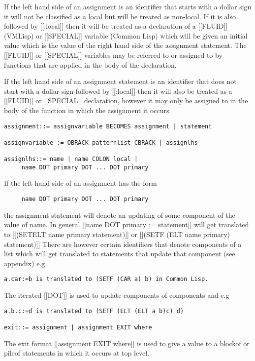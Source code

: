 \documentclass{article}
\begin{document}
If the left hand side of an assignment is an identifier that starts with
a dollar sign it will not be classified as a local but will
be treated as non-local. If it is also followed by [[:local]] then it
will be treated as a declaration of a [[FLUID]] (VMLisp) or [[SPECIAL]]
variable (Common Lisp) which will be given an initial value which is the
value of the right hand side of the assignment statement.
The [[FLUID]] or [[SPECIAL]] variables may be referred to or assigned to
by functions that are applied in the body of the declaration.
 
If the left hand side of an assignment statement is
an identifier that does not start with a dollar sign followed
by [[:local]] then it will also be treated as a [[FLUID]] or [[SPECIAL]]
declaration, however it may only be assigned to in the body
of the function in which the assignment it occurs.
\begin{verbatim}  
assignment::= assignvariable BECOMES assignment | statement
 
assignvariable := OBRACK patternlist CBRACK | assignlhs
 
assignlhs::= name | name COLON local |
     name DOT primary DOT ... DOT primary
\end{verbatim} 

If the left hand side of an assignment has the form
\begin{verbatim}  
     name DOT primary DOT ... DOT primary
\end{verbatim} 
the assignment statement will denote an updating of some component
of the value of name.  In general [[name DOT primary := statement]]
will get translated to [[(SETELT name primary statement)]] or
[[(SETF (ELT name primary) statement)]]
There are however certain identifiers that denote components of
a list which will get translated to statements that update that
component (see appendix) e.g. 
\begin{verbatim} 
a.car:=b is translated to (SETF (CAR a) b) in Common Lisp.
\end{verbatim} 
The iterated [[DOT]] is used to update components of components
and e.g 

\begin{verbatim} 
a.b.c:=d is translated to (SETF (ELT (ELT a b)c) d)
 
exit::= assignment | assignment EXIT where
\end{verbatim} 

The exit format [[assignment EXIT where]] is used to give a value to
a blockof or pileof statements in which it occurs at top level.
 
\end{document}
